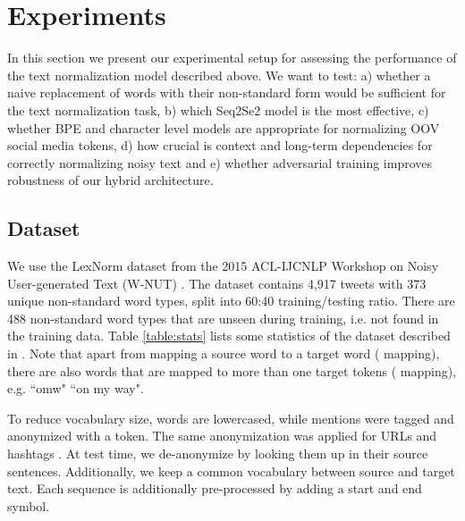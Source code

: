 \documentclass[letterpaper]{article} \usepackage{aaai19}  \usepackage{times}  \usepackage{helvet} \usepackage{courier}  \usepackage[hyphens]{url}  \usepackage{graphicx} \urlstyle{rm} \def\UrlFont{\rm}  \usepackage{graphicx}  \frenchspacing  \setlength{\pdfpagewidth}{8.5in}  \setlength{\pdfpageheight}{11in}
\newcommand{\citep}{\cite}
\begin{document}
\section{Experiments}\label{sec:exp}
In this section we present our experimental setup for assessing the performance of the text normalization model described above. 
We want to test: a) whether a naive replacement of words with their non-standard form would be sufficient for the text normalization task, b) which Seq2Se2 model is the most effective, c) whether BPE and character level models are appropriate for normalizing OOV social media tokens, d) how crucial is context and long-term dependencies for correctly normalizing noisy text and e) whether adversarial training improves robustness of our hybrid architecture.

\subsection{Dataset}
We use the LexNorm dataset from the 2015 ACL-IJCNLP Workshop on Noisy User-generated Text (W-NUT) \citep{baldwin2015shared}. The dataset contains 4,917 tweets with 373 unique non-standard word types, split into 60:40 training/testing ratio. There are 488 non-standard word types that are unseen during training, i.e. not found in the training data. Table \ref{table:stats} lists some statistics of the dataset described in \citep{baldwin2015shared}. Note that apart from mapping a source word to a target word ( mapping), there are also words that are mapped to more than one target tokens ( mapping), e.g. ``omw"  ``on my way".

To reduce vocabulary size, words are lowercased, while mentions were tagged and anonymized with a  token. The same anonymization was applied for URLs  and hashtags . At test time, we de-anonymize by looking them up in their source sentences. Additionally, we keep a common vocabulary between source and target text. Each sequence is additionally pre-processed by adding a start  and end  symbol.

\begin{table}
  \centering
      \caption{LexNorm statistics from \citep{baldwin2015shared} and vocabulary statistics after preprocessing}
  \label{table:stats}
\end{table}
\end{document}
